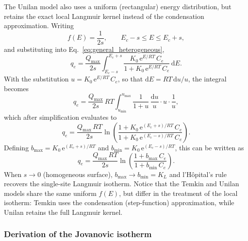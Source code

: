 	The Unilan model also uses a uniform (rectangular) energy
	distribution, but retains the exact local Langmuir kernel instead
	of the condensation approximation. Writing
	\begin{equation}
		f(E) = \frac{1}{2s}, \qquad E_c - s \leq E \leq E_c + s,
		\label{eq:unilan_fE}
	\end{equation}
	and substituting into Eq.~\eqref{eq:general_heterogeneous},
	\begin{equation}
		q_e = \frac{Q_{\max}}{2s}
		\int_{E_c - s}^{E_c + s}
		\frac{K_0\,\mathrm{e}^{E/RT}\, C_e}
		{1 + K_0\,\mathrm{e}^{E/RT}\, C_e}\,\mathrm{d}E.
	\end{equation}
	With the substitution $u = K_0\,\mathrm{e}^{E/RT}\,C_e$, so that
	$\mathrm{d}E = RT\,\mathrm{d}u / u$, the integral becomes
	\begin{equation}
		q_e = \frac{Q_{\max}}{2s}\, RT
		\int_{u_{\min}}^{u_{\max}}
		\frac{1}{1 + u}\,\frac{\mathrm{d}u}{u}
		\cdot u \cdot \frac{1}{u},
	\end{equation}
	which after simplification evaluates to
	\begin{equation}
		q_e = \frac{Q_{\max}\,RT}{2s}
		\ln\!\left(
		\frac{1 + K_0\,\mathrm{e}^{(E_c+s)/RT}\,C_e}
		{1 + K_0\,\mathrm{e}^{(E_c-s)/RT}\,C_e}
		\right).
		\label{eq:Unilan_derived}
	\end{equation}
	Defining $b_{\max} = K_0\,\mathrm{e}^{(E_c+s)/RT}$ and
	$b_{\min} = K_0\,\mathrm{e}^{(E_c-s)/RT}$, this can be written as
	\begin{equation}
		\boxed{q_e = \frac{Q_{\max}\,RT}{2s}
		\ln\!\left(
		\frac{1 + b_{\max}\, C_e}{1 + b_{\min}\, C_e}
		\right).}
	\end{equation}
	When $s \to 0$ (homogeneous surface), $b_{\max} \to b_{\min} = K_L$
	and l'H\^opital's rule recovers the single-site Langmuir isotherm.
	Notice that the Temkin and Unilan models share the same uniform
	$f(E)$, but differ in the treatment of the local isotherm: Temkin
	uses the condensation (step-function) approximation, while Unilan
	retains the full Langmuir kernel.

	\subsubsection{Derivation of the Jovanovic isotherm}

